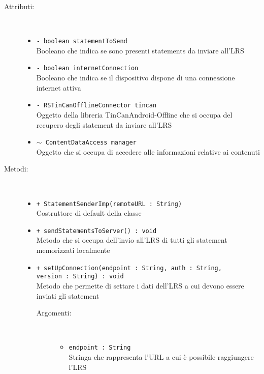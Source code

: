 \documentclass[../Tesi.tex]{subfiles}
\begin{document}
		\begin{description}
			\item[Attributi:] \
			\begin{itemize}
				\item \texttt{- boolean statementToSend}\\
				Booleano che indica se sono presenti statements da inviare all'LRS

				\item \texttt{- boolean internetConnection}\\
				Booleano che indica se il dispositivo dispone di una connessione internet attiva

				\item \texttt{- RSTinCanOfflineConnector tincan}\\
				Oggetto della libreria TinCanAndroid-Offline che si occupa del recupero degli statement da inviare all'LRS

				\item \texttt{$\sim$ ContentDataAccess manager}\\
				Oggetto che si occupa di accedere alle informazioni relative ai contenuti

			\end{itemize}

			\item[Metodi:] \
			\begin{itemize}
				\item \texttt{+ StatementSenderImp(remoteURL : String)}\\
				Costruttore di default della classe 
				
				\item \texttt{+ sendStatementsToServer() : void}\\
				Metodo che si occupa dell'invio all'LRS di tutti gli statement memorizzati localmente

				\item \texttt{+ setUpConnection(endpoint : String, auth : String, \\version : String) : void}\\
				Metodo che permette di settare i dati dell'LRS a cui devono essere inviati gli statement
				\begin{description}
					\item[Argomenti:] \
					\begin{itemize}
						\item \texttt{endpoint : String}\\
						Stringa che rappresenta l'URL a cui è possibile raggiungere l'LRS


\end{itemize}
\end{description}
\end{itemize}
\end{description}
\end{document}
